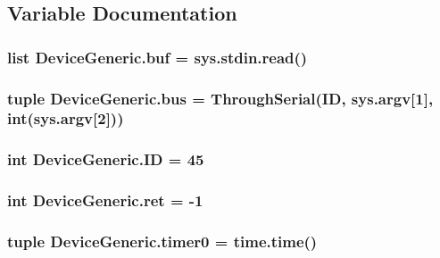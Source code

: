 \subsection{Variable Documentation}
\hypertarget{namespaceDeviceGeneric_a71165b95b92225bdd6d08b826c521c8b}{
\subsubsection[{buf}]{\setlength{\rightskip}{0pt plus 5cm}list Device\-Generic.\-buf = sys.\-stdin.\-read()}}\label{namespaceDeviceGeneric_a71165b95b92225bdd6d08b826c521c8b}
\hypertarget{namespaceDeviceGeneric_a084e2a9b523bbda45d571ea99fee0f31}{
\subsubsection[{bus}]{\setlength{\rightskip}{0pt plus 5cm}tuple Device\-Generic.\-bus = {\bf Through\-Serial}({\bf I\-D}, sys.\-argv\mbox{[}1\mbox{]}, int(sys.\-argv\mbox{[}2\mbox{]}))}}\label{namespaceDeviceGeneric_a084e2a9b523bbda45d571ea99fee0f31}
\hypertarget{namespaceDeviceGeneric_a40607bde9a8451d26d9e95c719722c14}{
\subsubsection[{I\-D}]{\setlength{\rightskip}{0pt plus 5cm}int Device\-Generic.\-I\-D = 45}}\label{namespaceDeviceGeneric_a40607bde9a8451d26d9e95c719722c14}
\hypertarget{namespaceDeviceGeneric_a8c6074f36f68d72fd1c72fcb62cca169}{
\subsubsection[{ret}]{\setlength{\rightskip}{0pt plus 5cm}int Device\-Generic.\-ret = -\/1}}\label{namespaceDeviceGeneric_a8c6074f36f68d72fd1c72fcb62cca169}
\hypertarget{namespaceDeviceGeneric_abd02f36eb5b20b6fcd71492463785563}{
\subsubsection[{timer0}]{\setlength{\rightskip}{0pt plus 5cm}tuple Device\-Generic.\-timer0 = time.\-time()}}\label{namespaceDeviceGeneric_abd02f36eb5b20b6fcd71492463785563}


